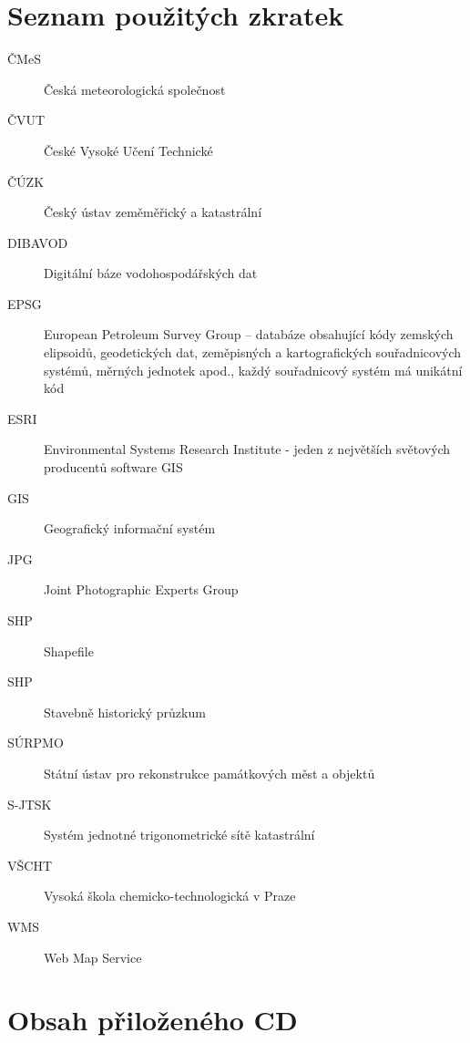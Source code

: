 \documentclass[thesis=M,czech]{FITthesis}[2012/06/26]
\begin{document}
\chapter{Seznam použitých zkratek}
\begin{description}
	\item[ČMeS] Česká meteorologická společnost
	\item[ČVUT] České Vysoké Učení Technické
	\item[ČÚZK] Český ústav zeměměřický a katastrální
	\item[DIBAVOD] Digitální báze vodohospodářských dat
	\item[EPSG] European Petroleum Survey Group – databáze obsahující kódy zemských elipsoidů, geodetických dat, zeměpisných a kartografických souřadnicových systémů, měrných jednotek apod., každý souřadnicový systém má unikátní kód
	\item[ESRI] Environmental Systems Research Institute - jeden z největších světových producentů software GIS
	\item[GIS] Geografický informační systém
	\item[JPG] Joint Photographic Experts Group
	\item[SHP] Shapefile
	\item[SHP] Stavebně historický průzkum
	\item[SÚRPMO] Státní ústav pro rekonstrukce památkových měst a objektů
	\item[S-JTSK] Systém jednotné trigonometrické sítě katastrální
	\item[VŠCHT] Vysoká škola chemicko-technologická v Praze
	\item[WMS] Web Map Service

\end{description}



\chapter{Obsah přiloženého CD}

\begin{figure}
\end{figure}
\end{document}

